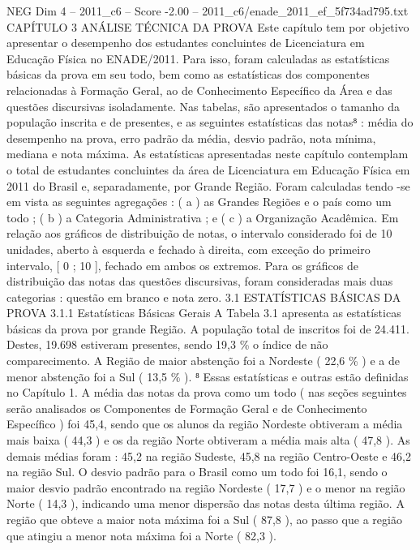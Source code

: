 \begin{textsample}{NEG Dim 4 – 2011\_c6 – Score -2.00 – 2011\_c6/enade\_2011\_ef\_5f734ad795.txt}  \label{ex:f4_neg_052}
CAPÍTULO 3 ANÁLISE TÉCNICA DA PROVA Este capítulo tem por objetivo apresentar o desempenho dos estudantes concluintes de Licenciatura em Educação Física no ENADE/2011.
Para isso, foram calculadas as estatísticas básicas da prova em seu todo, bem como as estatísticas dos componentes relacionadas à Formação Geral, ao de Conhecimento Específico da Área e das questões discursivas isoladamente.
Nas tabelas, são apresentados o tamanho da população inscrita e de presentes, e as seguintes estatísticas das notas⁸ : média do desempenho na prova, erro padrão da média, desvio padrão, nota mínima, mediana e nota máxima.
As estatísticas apresentadas neste capítulo contemplam o total de estudantes concluintes da área de Licenciatura em Educação Física em 2011 do Brasil e, separadamente, por Grande Região.
Foram calculadas tendo -se em vista as seguintes agregações : ( a ) as Grandes Regiões e o país como um todo ; ( b ) a Categoria Administrativa ; e ( c ) a Organização Acadêmica.
Em relação aos gráficos de distribuição de notas, o intervalo considerado foi de 10 unidades, aberto à esquerda e fechado à direita, com exceção do primeiro intervalo, [ 0 ; 10 ], fechado em ambos os extremos.
Para os gráficos de distribuição das notas das questões discursivas, foram consideradas mais duas categorias : questão em branco e nota zero. 3.1 ESTATÍSTICAS BÁSICAS DA PROVA 3.1.1 Estatísticas Básicas Gerais A Tabela 3.1 apresenta as estatísticas básicas da prova por grande Região.
A população total de inscritos foi de 24.411.
Destes, 19.698 estiveram presentes, sendo 19,3 \% o índice de não comparecimento.
A Região de maior abstenção foi a Nordeste ( 22,6 \% ) e a de menor abstenção foi a Sul ( 13,5 \% ). ⁸ Essas estatísticas e outras estão definidas no Capítulo 1.
A média das notas da prova como um todo ( nas seções seguintes serão analisados os Componentes de Formação Geral e de Conhecimento Específico ) foi 45,4, sendo que os alunos da região Nordeste obtiveram a média mais baixa ( 44,3 ) e os da região Norte obtiveram a média mais alta ( 47,8 ).
As demais médias foram : 45,2 na região Sudeste, 45,8 na região Centro-Oeste e 46,2 na região Sul.
O desvio padrão para o Brasil como um todo foi 16,1, sendo o maior desvio padrão encontrado na região Nordeste ( 17,7 ) e o menor na região Norte ( 14,3 ), indicando uma menor dispersão das notas desta última região.
A região que obteve a maior nota máxima foi a Sul ( 87,8 ), ao passo que a região que atingiu a menor nota máxima foi a Norte ( 82,3 ).

\end{textsample}
